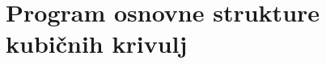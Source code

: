 \documentclass[12pt,a4paper,twoside]{article}
\newcommand{\literatura}{literatura}  %
\theoremstyle{definition} %
\theoremstyle{plain} %
\numberwithin{equation}{section}  %
\begin{document}
\appendix

\section{Program osnovne strukture kubičnih krivulj}


\cite{Washington2008}
\cite{Silverman2009}
\cite{Miller}
\cite{Jeffrey2008}
\cite{Lynn2007}
\cite{Gibson1999}







\cleardoublepage                           %

\cleardoublepage                           %
\printindex
\end{document}
